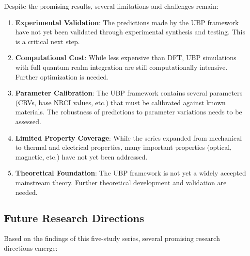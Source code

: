 \documentclass[11pt,a4paper]{article}
\begin{document}
Despite the promising results, several limitations and challenges remain:

\begin{enumerate}
    \item \textbf{Experimental Validation}: The predictions made by the UBP framework have not yet been validated through experimental synthesis and testing. This is a critical next step.
    
    \item \textbf{Computational Cost}: While less expensive than DFT, UBP simulations with full quantum realm integration are still computationally intensive. Further optimization is needed.
    
    \item \textbf{Parameter Calibration}: The UBP framework contains several parameters (CRVs, base NRCI values, etc.) that must be calibrated against known materials. The robustness of predictions to parameter variations needs to be assessed.
    
    \item \textbf{Limited Property Coverage}: While the series expanded from mechanical to thermal and electrical properties, many important properties (optical, magnetic, etc.) have not yet been addressed.
    
    \item \textbf{Theoretical Foundation}: The UBP framework is not yet a widely accepted mainstream theory. Further theoretical development and validation are needed.
\end{enumerate}

\subsection{Future Research Directions}

Based on the findings of this five-study series, several promising research directions emerge:
\end{document}
